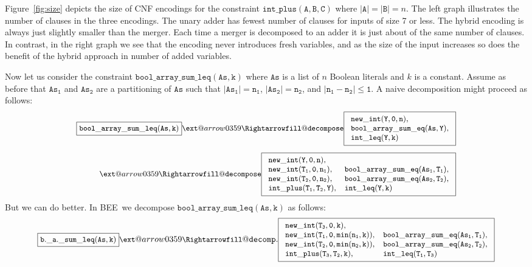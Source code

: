 \documentclass[runningheads,a4paper]{llncs}
\makeatletter
\newcommand{\xRightarrow}[2][]{\ext@arrow 0359\Rightarrowfill@{#1}{#2}}
\newcommand{\bee}{\textsf{BEE}}
\makeatother
\begin{document}
Figure~\ref{fig:size} depicts the size of CNF encodings for the
constraint $\mathtt{int\_plus(A,B,C)}$ where
$|\mathtt{A}|=|\mathtt{B}|=n$. The left graph illustrates the number
of clauses in the three encodings. The unary adder has fewest number
of clauses for inputs of size 7 or less. The hybrid encoding is always
just slightly smaller than the merger. Each time a merger is
decomposed to an adder it is just about of the same number of clauses.
In contrast, in the right graph we see that the encoding never
introduces fresh variables, and as the size of the input increases so
does the benefit of the hybrid approach in number of added variables.










Now let us consider the constraint
$\mathtt{bool\_array\_sum\_leq(As,k)}$ where $\mathtt{As}$ is a list
of $n$ Boolean literals and $k$ is a constant.  Assume as before that
$\mathtt{As_1}$ and $\mathtt{As_2}$ are a partitioning of
$\mathtt{As}$ such that $\mathtt{|As_1|=n_1}$, $\mathtt{|As_2|=n_2}$,
and $\mathtt{|n_1-n_2|\leq 1}$.
A naive decomposition might proceed as follows:\pagebreak
\[\small
\begin{array}{r}
\fbox{$\mathtt{bool\_array\_sum\_leq(As,k)}$}
    \xRightarrow[]{\mathtt{decompose}}
    \fbox{$
      \begin{array}{l}
        \mathtt{new\_int(Y,0,n)},\\
        \mathtt{bool\_array\_sum\_eq(As,Y)},\\
        \mathtt{int\_leq(Y,k)}
      \end{array}$}
\\[8mm]
    \xRightarrow[]{\mathtt{decompose}}
    \fbox{$\begin{array}{ll}
    \mathtt{new\_int(Y,0,n)},\\
    \mathtt{new\_int(T_1,0,n_1)},~ & \mathtt{bool\_array\_sum\_eq(As_1,T_1)},\\
    \mathtt{new\_int(T_2,0,n_2)},~ & \mathtt{bool\_array\_sum\_eq(As_2,T_2)},\\
    \mathtt{int\_plus(T_1,T_2,Y)},&
    \mathtt{int\_leq(Y,k)}
  \end{array}$}
\end{array}
\] 
But we can do better.
In \bee\ we decompose $\mathtt{bool\_array\_sum\_leq(As,k)}$ as
follows:
\[\small \fbox{$\mathtt{b.\_a.\_sum\_leq(As,k)}$}
    \xRightarrow[]{\mathtt{decomp.}}
    \fbox{$
  \begin{array}{ll}
    \mathtt{new\_int(T_3,0,k)},\\
    \mathtt{new\_int(T_1,0,min(n_1,k))}, & 
                   \mathtt{bool\_array\_sum\_eq(As_1,T_1)},\\
    \mathtt{new\_int(T_2,0,min(n_2,k))}, & 
                   \mathtt{bool\_array\_sum\_eq(As_2,T_2)},\\
     \mathtt{int\_plus(T_3,T_2,k)}, & \mathtt{int\_leq(T_1,T_3)}\\
    
  \end{array}$}
\]
\end{document}
